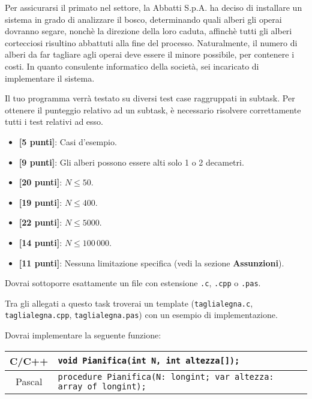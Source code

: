 Per assicurarsi il primato nel settore, la Abbatti S.p.A. ha deciso di installare un sistema in grado di analizzare il bosco, determinando quali alberi gli operai dovranno segare, nonchè la direzione della loro caduta, affinchè tutti gli alberi cortecciosi risultino abbattuti alla fine del processo. Naturalmente, il numero di alberi da far tagliare agli operai deve essere il minore possibile, per contenere i costi. In quanto consulente informatico della società, sei incaricato di implementare il sistema.

\Scoring
Il tuo programma verrà testato su diversi test case raggruppati in subtask.
Per ottenere il punteggio relativo ad un subtask, è necessario risolvere
correttamente tutti i test relativi ad esso.

\begin{itemize}[nolistsep,itemsep=2mm]
\item \textbf{ [5 punti]}: Casi d'esempio.
\item \textbf{ [9 punti]}: Gli alberi possono essere alti solo 1 o 2 decametri.
\item \textbf{ [20 punti]}: ${N} \le 50$.
\item \textbf{ [19 punti]}: ${N} \le 400$.
\item \textbf{ [22 punti]}: ${N} \le 5000$.
\item \textbf{ [14 punti]}: ${N} \le 100\,000$.
\item \textbf{ [11 punti]}: Nessuna limitazione specifica (vedi la sezione \textbf{Assunzioni}).
\end{itemize}

\Implementation

Dovrai sottoporre esattamente un file con estensione \texttt{.c}, \texttt{.cpp} o \texttt{.pas}.

\begin{warning}
Tra gli allegati a questo task troverai un template (\texttt{taglialegna.c}, \texttt{taglialegna.cpp}, \texttt{taglialegna.pas}) con un esempio di implementazione.
\end{warning}

Dovrai implementare la seguente funzione:

\begin{center}\begin{tabularx}{\textwidth}{|c|X|}
\hline
C/C++  & \verb|void Pianifica(int N, int altezza[]);|\\ %
\hline
Pascal & \verb|procedure Pianifica(N: longint; var altezza: array of longint);|\\
\hline
\end{tabularx}\end{center}


